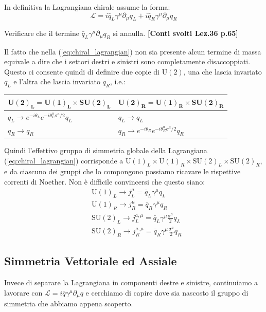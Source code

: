 \documentclass[../main.tex]{subfiles}
\begin{document}
In definitiva la Lagrangiana chirale assume la forma:
\begin{equation}
    \boxed{\mathscr{L} = i\bar q_L\gamma^\mu\partial_\mu q_L + i\bar q_R\gamma^\mu\partial_\mu q_R}
    \label{eq:chiral_lagrangian}
\end{equation}
\begin{exercise}
    Verificare che il termine $\bar q_L\gamma^\mu\partial_\mu q_R$ si annulla.
    \textbf{[Conti svolti Lez.36 p.65]}
\end{exercise}

Il fatto che nella (\ref{eq:chiral_lagrangian}) non sia presente alcun termine di massa equivale a dire che i settori destri e sinistri sono completamente disaccoppiati. Questo ci consente quindi di definire due copie di $\textrm{U}(2)$, una che lascia invariato $q_L$ e l'altra che lascia invariato $q_R$, i.e.:
\begin{center}
\begin{tabular}{l|l}
    $\mathbf{\textbf{U}(2)_L = \textbf{U}(1)_L \times \textbf{SU}(2)_L}$ & $\mathbf{\textbf{U}(2)_R = \textbf{U}(1)_R \times \textbf{SU}(2)_R}$ \\ \hline
    $q_L \rightarrow e^{-i\theta_L}e^{-i\theta_L^a{\sigma^a}/{2}}q_L$ & $q_L \rightarrow q_L$ \\
    $q_R \rightarrow q_R$ & $q_R \rightarrow e^{-i\theta_R}e^{-i\theta_R^a{\sigma^a}/{2}}q_R$ \\
\end{tabular}
\end{center}
Quindi l'effettivo gruppo di simmetria globale della Lagrangiana (\ref{eq:chiral_lagrangian}) corrisponde a $\textrm{U}(1)_L\times\textrm{U}(1)_R\times\textrm{SU}(2)_L\times\textrm{SU}(2)_R$, e da ciascuno dei gruppi che lo compongono possiamo ricavare le rispettive correnti di Noether. Non è difficile convincersi che questo siano:
\[\boxed{\begin{aligned}
    &\textrm{U}(1)_L  \rightarrow j^\mu_L = \bar q_L \gamma^\mu q_L    \\
    &\textrm{U}(1)_R  \rightarrow j^\mu_R = \bar q_R \gamma^\mu q_R    \\
    &\textrm{SU}(2)_L \rightarrow j^{a,\mu}_L = \bar q_L \gamma^\mu \frac{\sigma^a}{2}q_L    \\
    &\textrm{SU}(2)_R \rightarrow j^{a,\mu}_R = \bar q_R \gamma^\mu \frac{\sigma^a}{2}q_R   
\end{aligned}}\]

\subsection{Simmetria Vettoriale ed Assiale}
Invece di separare la Lagrangiana in componenti destre e sinistre, continuiamo a lavorare con $\mathscr{L} = i\bar q\gamma^\mu\partial_\mu q$ e cerchiamo di capire dove sia nascosto il gruppo di simmetria che abbiamo appena scoperto.
\end{document}
